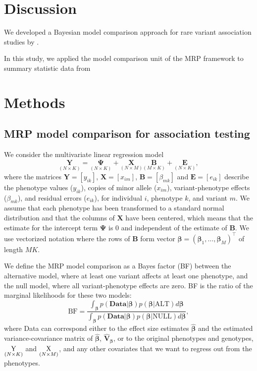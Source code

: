 \documentclass{nature}
\def\bs{\boldsymbol}
\begin{document}
\section{Discussion}
We developed a Bayesian model comparison approach for rare variant association studies by . 

In this study, we applied the model comparison unit of the MRP framework to summary statistic data from 

\newpage
\section{Methods}
 
\subsection{MRP model comparison for association testing}
We consider the multivariate linear regression model 
$$\underset{\left(N\times K\right)}{\mathbf{\textrm{Y}}} 
= \underset{\left(N\times K\right)}{\mathbf{\Psi}}  + \underset{\left(N\times M\right)}{\mathbf{\textrm{X}}}\underset{\left(M \times K\right)}{\mathbf{\textrm{B}}} 
+ \underset{\left(N\times K\right)}{\mathbf{\textrm{E}}},$$
where the matrices $\mathbf{\textrm{Y}} = \left[{y}_{i k}\right]$, $\mathbf{\textrm{X}} = \left[ x_{i m}\right]$, 
$\mathbf{\textrm{B}} = \left[ \beta_{m k} \right]$ and $\mathbf{\textrm{E}} = \left[e_{i k}\right]$  describe the phenotype values ($y_{i k}$),
copies of minor allele ($x_{i m}$), variant-phenotype effects ($\beta_{m k}$), and residual errors ($e_{i k}$), 
for individual $i$, phenotype $k$, and variant $m$. 
We assume that each phenotype has been transformed to a standard normal
distribution and that the columns of ${\mathbf{{\textrm{X}}}}$ 
have been centered, which means that the estimate for the intercept term ${\mathbf{\Psi}}$ is 0 and independent of the estimate of ${\mathbf{\textrm{B}}}$.
We use vectorized notation where the rows of ${\mathbf{\textrm{B}}}$ form vector 
$\bs {{ \beta}} = \left(\bs {{ \beta}}_{1},\dots,\bs {{\beta}}_{M}\right)^{\intercal}$
of length $MK$.

\noindent We define the MRP model comparison as a Bayes factor (BF) between the alternative model, where at least one variant
affects at least one phenotype, and the null model, where all variant-phenotype effects are zero.  
\noindent BF is the ratio of the marginal likelihoods for these two models: 
$$ \textrm{BF} = \frac{\int_{{\bs {\beta}}}p\left(\mathbf{\textrm{Data}}|{\bs {\beta}}\right)p\left({\bs {\beta}}|\textrm{ALT}\right)d{\bs {\beta}}}{\int_{{\bs {\beta}}}p\left(\mathbf{\textrm{Data}}|{\bs {\beta}}\right)p\left({\bs {\beta}}|\textrm{NULL}\right)d{\bs {\beta}}},$$ 
where Data can correspond either to the effect size estimates $\bs {\widehat{ \beta}}$ and the estimated variance-covariance matrix of  $\bs {\widehat{ \beta}}$, $\widehat{\mathbf{\textrm{V}}}_{\bs{\beta}}$, or to the original phenotypes and genotypes, 
$\underset{\left(N\times K\right)}{\mathbf{\textrm{\textrm{Y}}}}$ and $ \underset{\left(N\times M\right)}{\mathbf{\textrm{\textrm{X}}}}$, and any other covariates that we
want to regress out from the phenotypes. 
\end{document}
